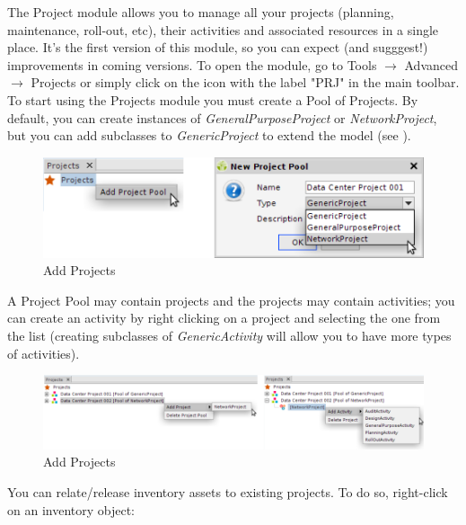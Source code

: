 \documentclass[a4paper]{article}
\begin{document}
			The Project module allows you to manage all your projects (planning, maintenance, roll-out, etc), their activities and associated resources in a single place. It's the first version of this module, so you can expect (and sugggest!) improvements in coming versions. To open the module, go to Tools $\rightarrow$ Advanced $\rightarrow$ Projects or simply click on the icon with the label "PRJ" in the main toolbar.\\
			To start using the Projects module you must create a Pool of Projects. By default, you can create instances of \textit{GeneralPurposeProject} or \textit{NetworkProject}, but you can add subclasses to \textit{GenericProject} to extend the model (see \textbf{}).
		    
		    \begin{figure}[h!]
		    	\centering
		    	\includegraphics[width=0.5\linewidth]{img/projects_new_project_pool.png}
		    	\caption{Add Projects}	    
		    	\label{fig:projects_actions}
		    \end{figure}
		    		    
		    A Project Pool may contain projects and the projects may contain activities; you can create an activity by right clicking on a project and selecting the one from the list (creating subclasses of \textit{GenericActivity} will allow you to have more types of activities).
		    
		    \begin{figure}[h!]
		    	\centering
		    	\includegraphics[width=0.9\linewidth]{img/projects_new_project_activity.png}
		    	\caption{Add Projects}	    
		    	\label{fig:projects_new_project_activity}
		    \end{figure}		    
		    
		    You can relate/release inventory assets to existing projects. To do so, right-click on an inventory object:
		    		    		    
\end{document}

